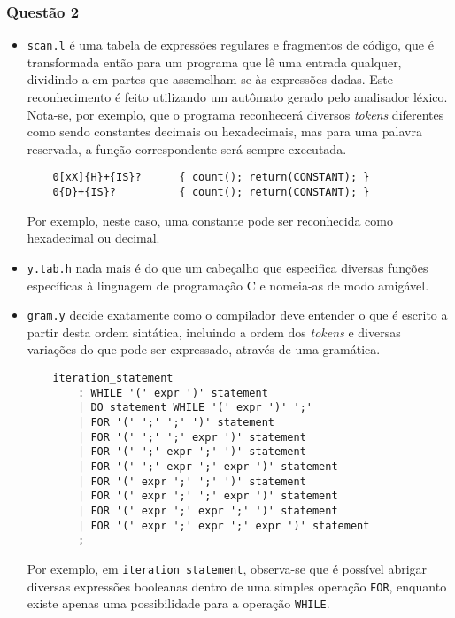 \documentclass{../sftex/sftex}
\begin{document}
\subsubsection*{Questão 2}
\begin{itemize}
    \item \verb!scan.l! é uma tabela de expressões regulares e fragmentos de
    código, que é transformada então para um programa que lê uma entrada
    qualquer, dividindo-a em partes que assemelham-se às expressões dadas. Este
    reconhecimento é feito utilizando um autômato gerado pelo analisador léxico.
    Nota-se, por exemplo, que o programa reconhecerá diversos \emph{tokens}
    diferentes como sendo constantes decimais ou hexadecimais, mas para uma
    palavra reservada, a função correspondente será sempre executada.

    \begin{verbatim}
    0[xX]{H}+{IS}?      { count(); return(CONSTANT); }
    0{D}+{IS}?          { count(); return(CONSTANT); }    \end{verbatim}

    Por exemplo, neste caso, uma constante pode ser reconhecida como
    hexadecimal ou decimal.

    \item \verb!y.tab.h! nada mais é do que um cabeçalho que especifica
    diversas funções específicas à linguagem de programação C e nomeia-as de
    modo amigável.

    \item \verb!gram.y! decide exatamente como o compilador deve entender o
    que é escrito a partir desta ordem sintática, incluindo a ordem dos
    \emph{tokens} e diversas variações do que pode ser expressado, através de
    uma gramática.

    \begin{verbatim}
    iteration_statement
        : WHILE '(' expr ')' statement
        | DO statement WHILE '(' expr ')' ';'
        | FOR '(' ';' ';' ')' statement
        | FOR '(' ';' ';' expr ')' statement
        | FOR '(' ';' expr ';' ')' statement
        | FOR '(' ';' expr ';' expr ')' statement
        | FOR '(' expr ';' ';' ')' statement
        | FOR '(' expr ';' ';' expr ')' statement
        | FOR '(' expr ';' expr ';' ')' statement
        | FOR '(' expr ';' expr ';' expr ')' statement
        ; \end{verbatim}

    Por exemplo, em \verb!iteration_statement!, observa-se que é possível
    abrigar diversas expressões booleanas dentro de uma simples operação
    \verb!FOR!, enquanto existe apenas uma possibilidade para a operação
    \verb!WHILE!.
\end{itemize}
\end{document}
